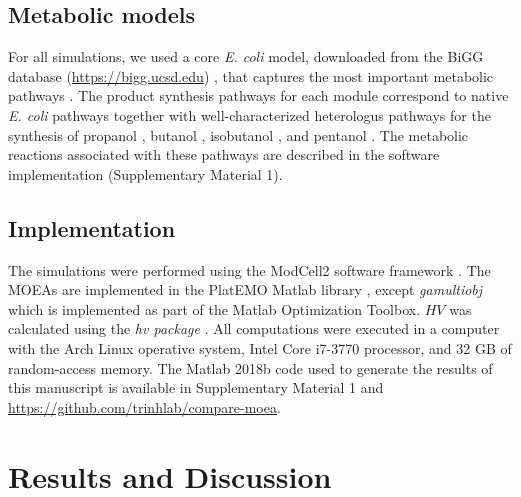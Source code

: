 {\subsection{Metabolic models}
For all simulations, we used a core \textit{E. coli} model, downloaded from the BiGG database (\url{https://bigg.ucsd.edu})  \cite{king2015}, that captures the most important metabolic pathways \cite{palsson2015}.
The product synthesis pathways for each module correspond to native \textit{E. coli} pathways together with well-characterized heterologus pathways for the synthesis of
propanol \cite{tseng2012},
butanol \cite{shen2011},
isobutanol \cite{atsumi2008},
and pentanol \cite{tseng2012}.
The metabolic reactions associated with  these pathways are described in the software implementation (Supplementary Material 1).

\subsection{Implementation} \label{sec:implementation}
The simulations were performed using the ModCell2 software framework \cite{garcia2019}.
The MOEAs are implemented in the PlatEMO Matlab library \cite{tian2017}, except \textit{gamultiobj} which is implemented as part of the Matlab Optimization Toolbox. $HV$ was calculated using the \textit{hv package} \cite{fonseca2006}. All computations were executed in a computer with the Arch Linux operative system, Intel Core i7-3770 processor, and 32 GB of random-access memory. The Matlab 2018b code used to generate the results of this manuscript is available in Supplementary Material 1 and \url{https://github.com/trinhlab/compare-moea}.

\section{Results and Discussion}
}

